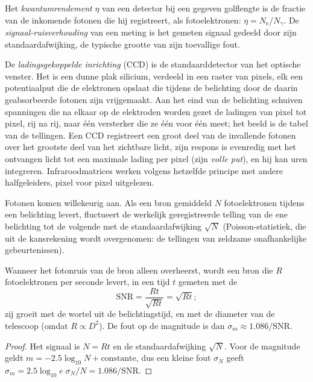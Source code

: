 \begin{definition}\label{def:b1:observing-the-sky:detector}
Het \emph{kwantumrendement} $\eta$ van een detector bij een
gegeven golflengte is de fractie van de inkomende fotonen die hij registreert, als
fotoelektronen: $\eta = N_\mathrm{e}/N_\gamma$. De
\emph{signaal-ruisverhouding} van een meting is het
gemeten signaal gedeeld door zijn standaardafwijking, de typische grootte van zijn
toevallige fout.
\end{definition}

De \emph{ladingsgekoppelde inrichting} (CCD) is de standaarddetector van het optische
venster. Het is een dunne plak silicium, verdeeld in een raster van pixels, elk een
potentiaalput die de elektronen opslaat die tijdens de belichting door de daarin
geabsorbeerde fotonen zijn vrijgemaakt. Aan het eind van de belichting schuiven
spanningen die na elkaar op de elektroden worden gezet de ladingen van pixel tot pixel,
rij na rij, naar één versterker die ze één voor één meet; het beeld is de tabel van de
tellingen. Een CCD registreert een groot deel van de invallende fotonen over het
grootste deel van het zichtbare licht, zijn respons is evenredig met het ontvangen licht
tot een maximale lading per pixel (zijn \emph{volle put}), en hij kan uren integreren.
Infraroodmatrices werken volgens hetzelfde principe met andere halfgeleiders, pixel
voor pixel uitgelezen.

Fotonen komen willekeurig aan. Als een bron gemiddeld $N$ fotoelektronen tijdens een
belichting levert, fluctueert de werkelijk geregistreerde telling van de ene belichting
tot de volgende met de standaardafwijking $\sqrt N$ (Poisson-statistiek, die uit de
kansrekening wordt overgenomen: de tellingen van zeldzame onafhankelijke gebeurtenissen).

\begin{proposition}[Fotonruis]\label{prop:b1:observing-the-sky:snr}
Wanneer het fotonruis van de bron alleen overheerst, wordt een bron die $R$
fotoelektronen per seconde levert, in een tijd $t$ gemeten met de
\[
  \mathrm{SNR} = \frac{Rt}{\sqrt{Rt}} = \sqrt{Rt} ;
\]
zij groeit met de wortel uit de belichtingstijd, en met de diameter van de telescoop
(omdat $R \propto D^2$). De fout op de magnitude is dan $\sigma_m \approx 1.086/\mathrm{SNR}$.
\end{proposition}

\begin{proof}
Het signaal is $N = Rt$ en de standaardafwijking $\sqrt N$. Voor de magnitude geldt
$m = -2.5\log_{10}N + \text{constante}$, dus een kleine fout $\sigma_N$ geeft
$\sigma_m = 2.5\log_{10}e\;\sigma_N/N = 1.086/\mathrm{SNR}$.
\end{proof}

